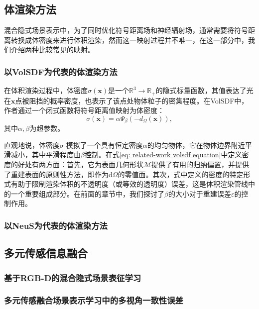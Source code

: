 \subsection{体渲染方法}
混合隐式场景表示中，为了同时优化符号距离场和神经辐射场，通常需要将符号距离转换成体密度来进行体积渲染，然而这一映射过程并不唯一，在这一部分中，我们介绍两种比较常见的映射。

\subsubsection{以VolSDF为代表的体渲染方法}
在体积渲染过程中，体密度$\sigma(\mathbf{x})$是一个$\mathbb{R}^3\to\mathbb{R}_+$的隐式标量函数，其值表达了光在$\mathbf{x}$点被阻挡的概率密度，也表示了该点处物体粒子的密集程度。在VolSDF\cite{yariv_volume_2021}中，作者通过一个闭式函数将符号距离值映射为体密度：
\begin{equation}
    \sigma(\mathbf{x}) = \alpha\Psi_\beta(-d_\Omega(\mathbf{x})),
    \label{eq: related-work volsdf equation}
\end{equation}
其中$\alpha,\beta$为超参数。

直观地说，体密度$\sigma$ 模拟了一个具有恒定密度$\alpha$的均匀物体，它在物体边界附近平滑减小，其中平滑程度由$\beta$控制。在式\ref{eq: related-work volsdf equation}中定义密度的好处有两方面：首先，它为表面几何形状$\mathcal{M}$提供了有用的归纳偏置，并提供了重建表面的原则性方法，即作为$\text{d}\Omega$的零值面。其次，式中定义的密度的特定形式有助于限制渲染体积的不透明度（或等效的透明度）误差，这是体积渲染管线中的一个重要组成部分。在前面的章节中，我们探讨了$\beta$的大小对于重建误差$\varepsilon$的控制作用。

\subsubsection{以NeuS为代表的体渲染方法}

\subsection{多元传感信息融合}

\subsubsection{基于RGB-D的混合隐式场景表征学习}

\subsubsection{多元传感融合场景表示学习中的多视角一致性误差}

